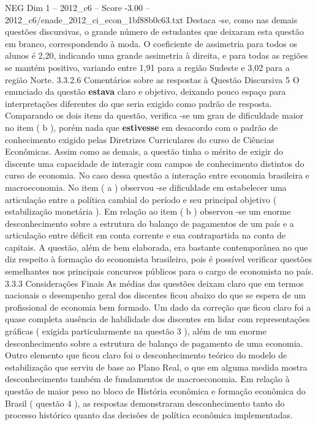\begin{textsample}{NEG Dim 1 – 2012\_c6 – Score -3.00 – 2012\_c6/enade\_2012\_ci\_econ\_1bf88b0c63.txt}
Destaca -se, como nas demais questões discursivas, o grande número de estudantes que deixaram esta questão em branco, correspondendo à moda.
O coeficiente de assimetria para todos os alunos é 2,20, indicando uma grande assimetria à direita, e para todas as regiões se mantém positivo, variando entre 1,91 para a região Sudeste e 3,02 para a região Norte. 3.3.2.6 Comentários sobre as respostas à Questão Discursiva 5 O enunciado da questão \textbf{estava} claro e objetivo, deixando pouco espaço para interpretações diferentes do que seria exigido como padrão de resposta.
Comparando os dois itens da questão, verifica -se um grau de dificuldade maior no item ( b ), porém nada que \textbf{estivesse} em desacordo com o padrão de conhecimento exigido pelas Diretrizes Curriculares do curso de Ciências Econômicas.
Assim como as demais, a questão tinha o mérito de exigir do discente uma capacidade de interagir com campos de conhecimento distintos do curso de economia.
No caso dessa questão a interação entre economia brasileira e macroeconomia.
No item ( a ) observou -se dificuldade em estabelecer uma articulação entre a política cambial do período e seu principal objetivo ( estabilização monetária ).
Em relação ao item ( b ) observou -se um enorme desconhecimento sobre a estrutura do balanço de pagamentos de um país e a articulação entre déficit em conta corrente e sua contrapartida na conta de capitais.
A questão, além de bem elaborada, era bastante contemporânea no que diz respeito à formação do economista brasileiro, pois é possível verificar questões semelhantes nos principais concursos públicos para o cargo de economista no país. 3.3.3 Considerações Finais As médias das questões deixam claro que em termos nacionais o desempenho geral dos discentes ficou abaixo do que se espera de um profissional de economia bem formado.
Um dado da correção que ficou claro foi a quase completa ausência de habilidade dos discentes em lidar com representações gráficas ( exigida particularmente na questão 3 ), além de um enorme desconhecimento sobre a estrutura de balanço de pagamento de uma economia.
Outro elemento que ficou claro foi o desconhecimento teórico do modelo de estabilização que serviu de base ao Plano Real, o que em alguma medida mostra desconhecimento também de fundamentos de macroeconomia.
Em relação à questão de maior peso no bloco de História econômica e formação econômica do Brasil ( questão 4 ), as respostas demonstraram desconhecimento tanto do processo histórico quanto das decisões de política econômica implementadas.

\end{textsample}
